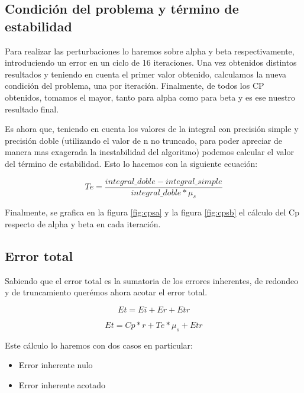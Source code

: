 \documentclass[11pt,a4paper]{article}
\begin{document}
\subsection{Condición del problema y término de estabilidad}

Para realizar las perturbaciones lo haremos sobre alpha y beta respectivamente, introduciendo un error en un ciclo de 16 iteraciones. Una vez obtenidos distintos resultados y teniendo en cuenta el primer valor obtenido, calculamos la nueva condición del problema, una por iteración. Finalmente, de todos los CP obtenidos, tomamos el mayor, tanto para alpha como para beta y es ese nuestro resultado final.

Es ahora que, teniendo en cuenta los valores de la integral con precisión simple y precisión doble (utilizando el valor de n no truncado, para poder apreciar de manera mas exagerada la inestabilidad del algoritmo) podemos calcular el valor del término de estabilidad. Esto lo hacemos con la siguiente ecuación:


\begin{equation}
    Te = \frac{integral\_doble - integral\_simple}{integral\_doble*\mu_s}
\end{equation}

Finalmente, se grafica en la figura \ref{fig:cpsa} y la figura \ref{fig:cpsb} el cálculo del Cp respecto de alpha y beta en cada iteración.

\subsection{Error total}

Sabiendo que el error total es la sumatoria de los errores inherentes, de redondeo y de truncamiento querémos ahora acotar el error total.


\begin{equation}
Et = Ei + Er + Etr
\end{equation}


\begin{equation}
    Et = Cp * r + Te * \mu_s + Etr 
\end{equation}


Este cálculo lo haremos con dos casos en particular:

\begin{itemize}
\item Error inherente nulo
\item Error inherente acotado
\end{itemize}
\end{document}
